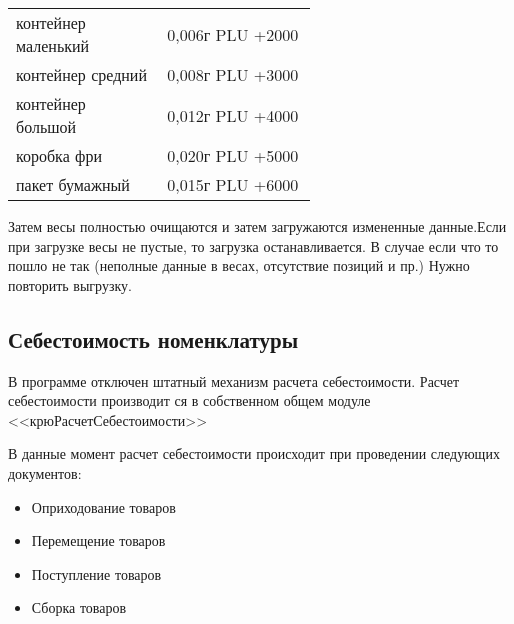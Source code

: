 

\vspace{\baselineskip}
\begin{tabular}{p{0.3\linewidth}p{0.3\linewidth}}
	\toprule
	контейнер маленький & 0,006г PLU +2000 \\
	контейнер средний & 0,008г PLU +3000 \\
	контейнер большой & 0,012г PLU +4000 \\
	коробка фри  & 0,020г PLU +5000 \\
	пакет бумажный  & 0,015г PLU +6000 \\
	\bottomrule %
\end{tabular}
\vspace{\baselineskip}


 Затем весы полностью очищаются и затем загружаются измененные данные.Если при загрузке весы не пустые, то загрузка останавливается.
 В случае если что то пошло не так (неполные данные в весах, отсутствие позиций и пр.) Нужно повторить выгрузку.


\subsection{Себестоимость номенклатуры}\label{1002}

В программе отключен штатный механизм расчета себестоимости. Расчет себестоимости производит ся в собственном общем модуле <<крюРасчетСебестоимости>>

В данные момент расчет себестоимости происходит при проведении следующих документов:
\begin{itemize}
	\item Оприходование товаров
	\item Перемещение товаров
	\item Поступление товаров
	\item Сборка товаров

\end{itemize}

